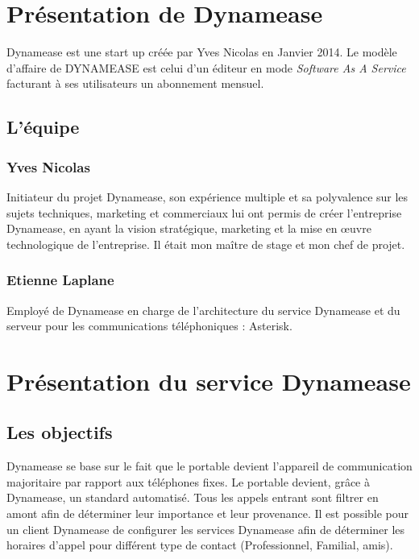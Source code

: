 \section{Présentation de Dynamease}

Dynamease est une start up créée par Yves Nicolas en Janvier 2014. Le modèle d'affaire de DYNAMEASE est celui d’un éditeur en mode \textit{Software As A Service} facturant à ses utilisateurs un abonnement mensuel.

\subsection{L'équipe} 

\subsubsection{Yves Nicolas}

Initiateur du projet Dynamease, son expérience multiple et sa polyvalence sur les sujets techniques, marketing et commerciaux lui ont permis de créer l’entreprise Dynamease, en ayant la vision stratégique, marketing et la mise en œuvre technologique de l’entreprise. Il était mon maître de stage et mon chef de projet.

\subsubsection{Etienne Laplane}

Employé de Dynamease en charge de l’architecture du service Dynamease et du serveur pour les communications téléphoniques : Asterisk.


\section{Présentation du service Dynamease}

\subsection{Les objectifs}

Dynamease se base sur le fait que le portable devient l'appareil de communication majoritaire par rapport aux téléphones fixes. Le portable devient, grâce à Dynamease, un standard automatisé. Tous les appels entrant sont filtrer en amont afin de déterminer leur importance et leur provenance. Il est possible pour un client Dynamease de configurer les services Dynamease afin de déterminer les horaires d'appel pour différent type de contact (Professionnel, Familial, amis).

